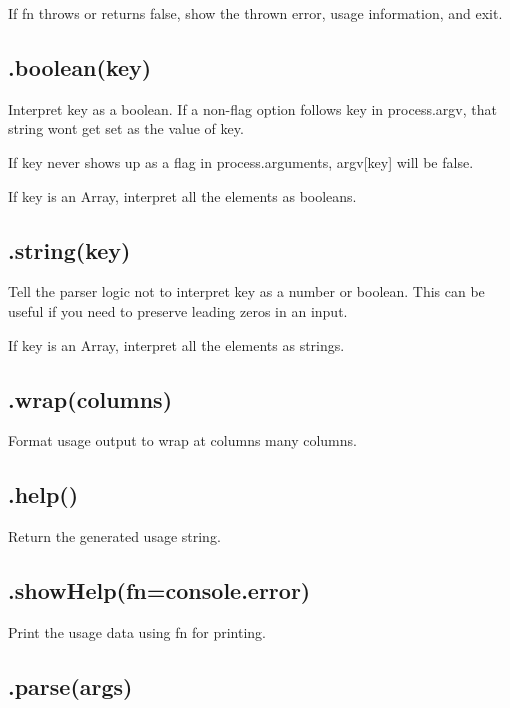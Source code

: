 If {\ttfamily fn} throws or returns {\ttfamily false}, show the thrown error, usage information, and exit.

\subsection*{.boolean(key) }

Interpret {\ttfamily key} as a boolean. If a non-\/flag option follows {\ttfamily key} in {\ttfamily process.\+argv}, that string won\textquotesingle{}t get set as the value of {\ttfamily key}.

If {\ttfamily key} never shows up as a flag in {\ttfamily process.\+arguments}, {\ttfamily argv\mbox{[}key\mbox{]}} will be {\ttfamily false}.

If {\ttfamily key} is an Array, interpret all the elements as booleans.

\subsection*{.string(key) }

Tell the parser logic not to interpret {\ttfamily key} as a number or boolean. This can be useful if you need to preserve leading zeros in an input.

If {\ttfamily key} is an Array, interpret all the elements as strings.

\subsection*{.wrap(columns) }

Format usage output to wrap at {\ttfamily columns} many columns.

\subsection*{.help() }

Return the generated usage string.

\subsection*{.show\+Help(fn=console.\+error) }

Print the usage data using {\ttfamily fn} for printing.

\subsection*{.parse(args) }

